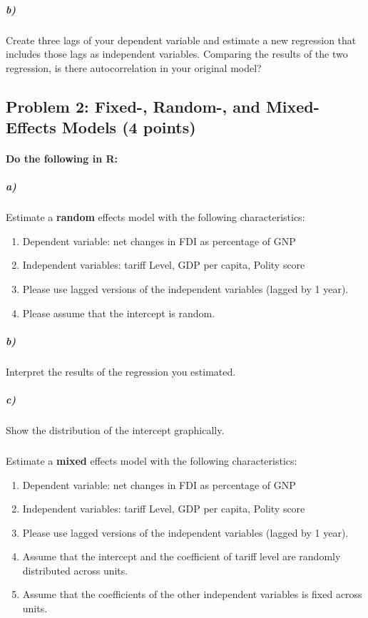 \documentclass[12pt]{article}
\begin{document}
\subparagraph{b)} Create three lags of your dependent variable and estimate a new regression that includes those lags as independent variables. Comparing the results of the two regression, is there autocorrelation in your original model?



\subsection*{Problem 2: Fixed-, Random-, and Mixed-Effects Models (4 points)}

\paragraph{Do the following in R:}

\subparagraph{a)} Estimate a \textbf{random}  effects model with the following characteristics:

\begin{enumerate}
	\item Dependent variable: net changes in FDI as percentage of GNP
	\item Independent variables: tariff Level, GDP per capita, Polity score
	\item Please use lagged versions of the independent variables (lagged by 1 year).
	\item Please assume that the intercept is random.
\end{enumerate}

\subparagraph{b)} Interpret the results of the regression you estimated.

\subparagraph{c)} Show the distribution of the intercept graphically.

\subparagraph{} Estimate a \textbf{mixed} effects model with the following characteristics:

\begin{enumerate}
	\item Dependent variable: net changes in FDI as percentage of GNP
	\item Independent variables: tariff Level, GDP per capita, Polity score
	\item Please use lagged versions of the independent variables (lagged by 1 year).
	\item Assume that the intercept and the coefficient of tariff level are randomly distributed across units.
	\item Assume that the coefficients of the other independent variables is fixed across units.
\end{enumerate}
\end{document}
